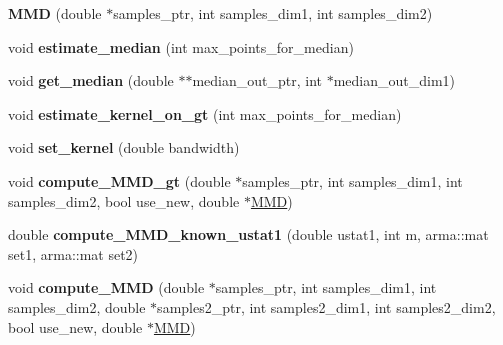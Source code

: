 \begin{DoxyCompactItemize}
\item 
{\bfseries M\+MD} (double $\ast$samples\+\_\+ptr, int samples\+\_\+dim1, int samples\+\_\+dim2)\hypertarget{classMMD_a9fa2c3a131f1028c8d8482cd3f481188}{}\label{classMMD_a9fa2c3a131f1028c8d8482cd3f481188}

\item 
void {\bfseries estimate\+\_\+median} (int max\+\_\+points\+\_\+for\+\_\+median)\hypertarget{classMMD_a3fccd3ddfd019c5dd835b09157734f7d}{}\label{classMMD_a3fccd3ddfd019c5dd835b09157734f7d}

\item 
void {\bfseries get\+\_\+median} (double $\ast$$\ast$median\+\_\+out\+\_\+ptr, int $\ast$median\+\_\+out\+\_\+dim1)\hypertarget{classMMD_aa695bfbce199b8af0720d185756b952e}{}\label{classMMD_aa695bfbce199b8af0720d185756b952e}

\item 
void {\bfseries estimate\+\_\+kernel\+\_\+on\+\_\+gt} (int max\+\_\+points\+\_\+for\+\_\+median)\hypertarget{classMMD_aefe8bf6b7a93c6c801362f245e08aae6}{}\label{classMMD_aefe8bf6b7a93c6c801362f245e08aae6}

\item 
void {\bfseries set\+\_\+kernel} (double bandwidth)\hypertarget{classMMD_a69009ba2236bcab4beef117a37c6ccdb}{}\label{classMMD_a69009ba2236bcab4beef117a37c6ccdb}

\item 
void {\bfseries compute\+\_\+\+M\+M\+D\+\_\+gt} (double $\ast$samples\+\_\+ptr, int samples\+\_\+dim1, int samples\+\_\+dim2, bool use\+\_\+new, double $\ast$\hyperlink{classMMD_1_1MMD}{M\+MD})\hypertarget{classMMD_abcf8787a6ec23db6b56fb2cc72433c1b}{}\label{classMMD_abcf8787a6ec23db6b56fb2cc72433c1b}

\item 
double {\bfseries compute\+\_\+\+M\+M\+D\+\_\+known\+\_\+ustat1} (double ustat1, int m, arma\+::mat set1, arma\+::mat set2)\hypertarget{classMMD_aadb3999575706fad2d4dd406c6da2859}{}\label{classMMD_aadb3999575706fad2d4dd406c6da2859}

\item 
void {\bfseries compute\+\_\+\+M\+MD} (double $\ast$samples\+\_\+ptr, int samples\+\_\+dim1, int samples\+\_\+dim2, double $\ast$samples2\+\_\+ptr, int samples2\+\_\+dim1, int samples2\+\_\+dim2, bool use\+\_\+new, double $\ast$\hyperlink{classMMD_1_1MMD}{M\+MD})\hypertarget{classMMD_a44633faa6e8c3f8428b760333c9ee5e4}{}\label{classMMD_a44633faa6e8c3f8428b760333c9ee5e4}

\end{DoxyCompactItemize}
